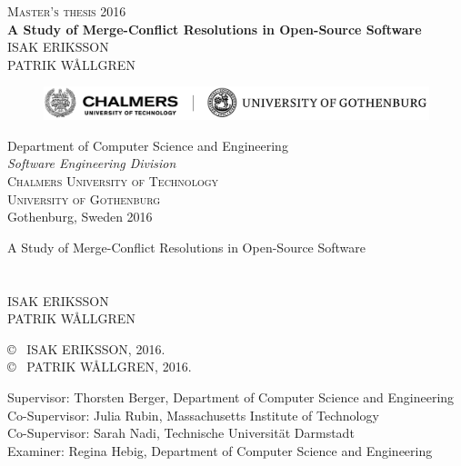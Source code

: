 \newpage
\thispagestyle{empty}
\begin{center}
	\textsc{\large Master's thesis 2016}\\[4cm]		%
	\textbf{\Large A Study of Merge-Conflict Resolutions in Open-Source Software} \\[1cm]
	{\large }
	{\large ISAK ERIKSSON\\PATRIK WÅLLGREN}
	
	\vfill	
	\begin{figure}[H]
	\centering
	\includegraphics[width=0.8\pdfpagewidth]{figure/auxiliary/chalmersgu.png} \\	
	\end{figure}	\vspace{5mm}	
	
	Department of Computer Science and Engineering \\
	\emph{Software Engineering Division}\\
	\textsc{Chalmers University of Technology} \\
	\textsc{University of Gothenburg} \\
	Gothenburg, Sweden 2016 \\
\end{center}


\newpage
\thispagestyle{plain}
\vspace*{4.5cm}
A Study of Merge-Conflict Resolutions in Open-Source Software\\
\\\\
ISAK ERIKSSON \setlength{\parskip}{1cm}\\
PATRIK WÅLLGREN \setlength{\parskip}{1cm}

\copyright ~ ISAK ERIKSSON, 2016. \setlength{\parskip}{1cm}\\
\copyright ~ PATRIK WÅLLGREN, 2016. \setlength{\parskip}{1cm}

Supervisor: Thorsten Berger, Department of Computer Science and Engineering\\
Co-Supervisor: Julia Rubin, Massachusetts Institute of Technology\\
Co-Supervisor: Sarah Nadi, Technische Universität Darmstadt\\
Examiner: Regina Hebig, Department of Computer Science and Engineering\setlength{\parskip}{1cm}

